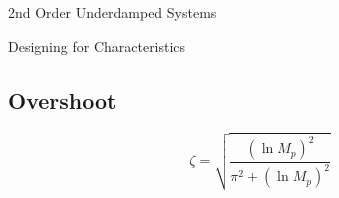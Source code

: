 \documentclass{../templates/topic}
\begin{document}
\begin{section}{2nd Order Underdamped Systems}
	
	\begin{subsection}{Designing for Characteristics}
	\subsection{Overshoot}
		\begin{equation*}
			\zeta = \sqrt{\frac{(\ln{M_p})^2}{\pi^2+(\ln{M_p})^2}}
		\end{equation*}
		
	\end{subsection}
	
\end{section}
\end{document}
